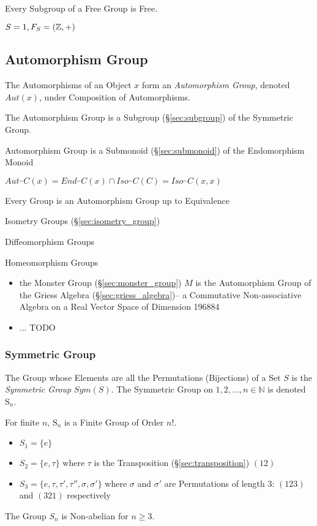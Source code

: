 Every Subgroup of a Free Group is Free. \cite{hatcher02}

$S = {1}, F_S = (\mathbb{Z},+)$



\subsection{Automorphism Group}\label{sec:automorphism_group}

The Automorphisms of an Object $x$ form an \emph{Automorphism Group},
denoted $Aut(x)$, under Composition of Automorphisms.

The Automorphism Group is a Subgroup (\S\ref{sec:subgroup}) of the
Symmetric Group.

Automorphism Group is a Submonoid (\S\ref{sec:submonoid})
of the Endomorphism Monoid %

$Aut_\cat{C}(x) = End_\cat{C}(x) \cap Iso_\cat{C}(C) =
Iso_\cat{C}(x,x)$

Every Group is an Automorphism Group up to Equivalence %

Isometry Groups (\S\ref{sec:isometry_group})

Diffeomorphism Groups %

Homeomorphism Groups %

\begin{itemize}
\item the Monster Group (\S\ref{sec:monster_group}) $M$ is the Automorphism
  Group of the Griess Algebra (\S\ref{sec:griess_algebra})-- a Commutative
  Non-associative Algebra on a Real Vector Space of Dimension 196884
\item ... TODO
\end{itemize}



\subsubsection{Symmetric Group}\label{sec:symmetric_group}

The Group whose Elements are all the Permutations (Bijections) of a
Set $S$ is the \emph{Symmetric Group} $Sym(S)$. The Symmetric Group on
${1, 2, ..., n} \in \mathbb{N}$ is denoted $\mathrm{S}_n$.

For finite $n$, $\mathrm{S}_n$ is a Finite Group of Order $n!$.

\begin{itemize}
    \item $S_1 = \{e\}$
    \item $S_2 = \{e,\tau\}$ where $\tau$ is the Transposition
      (\S\ref{sec:transposition}) $(12)$
    \item $S_3 = \{e, \tau, \tau', \tau'', \sigma, \sigma'\}$ where
      $\sigma$ and $\sigma'$ are Permutations of length 3: $(123)$ and
      $(321)$ respectively
\end{itemize}
The Group $S_n$ is Non-abelian for $n \geq 3$.

